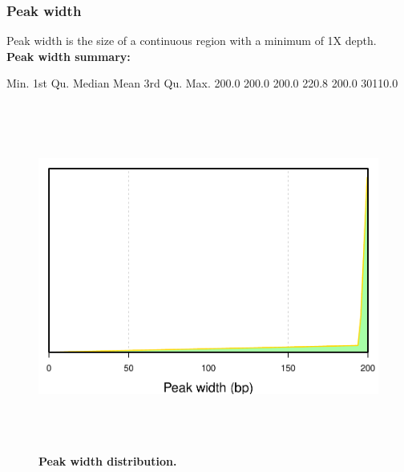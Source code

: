 \documentclass{article}
\begin{document}
\subsubsection{Peak width}
Peak width is the size of a continuous region with a minimum of 1X depth.
\vspace*{1\baselineskip}
\\{\textbf{Peak width summary:}}
\begin{Schunk}
\begin{Soutput}
   Min. 1st Qu.  Median    Mean 3rd Qu.    Max. 
  200.0   200.0   200.0   220.8   200.0 30110.0 
\end{Soutput}
\end{Schunk}


\begin{center}
\begin{figure}[H]
\includegraphics[width=6.5in, height=4.5in, page=1]{bamchop-chip-peak-width}
\caption{\textbf{Peak width distribution.}\small{}}
\end{figure}
\end{center}
\end{document}
